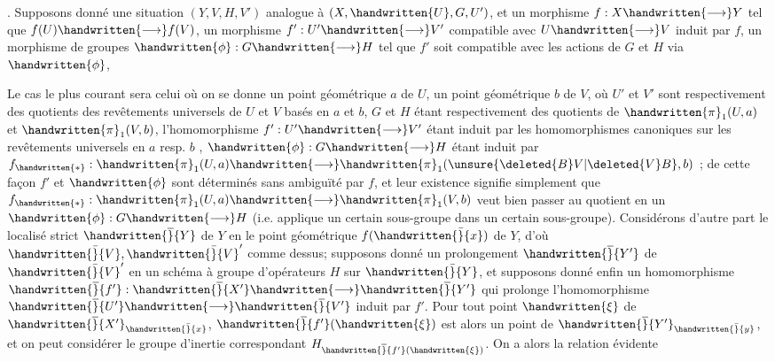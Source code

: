 
. Supposons donné une situation $(Y,V,H,V')$ analogue à $(X,\handwritten{U},G,U')$, et un morphisme $f:X\handwritten{\longrightarrow}Y$ tel que $f(U)\handwritten{\longrightarrow}f(V)$, un morphisme $f':U'\handwritten{\longrightarrow}V'$ compatible avec $U\handwritten{\longrightarrow}V$ induit par $f$, un morphisme de groupes $\handwritten{\phi}:G\handwritten{\longrightarrow}H$ tel que  $f'$ soit compatible avec les actions de $G$ et $H$ via $\handwritten{\phi}$, 

Le cas le plus courant sera celui où on se donne un point géométrique $a$ de $U$,  un point géométrique $b$  de $V$, où $U'$ et $V'$ sont respectivement des quotients des revêtements universels de $U$ et $V$ basés en $a$ et $b$, $G$ et $H$ étant respectivement des quotients de $\handwritten{\pi}_{1}(U,a)$ et $\handwritten{\pi}_{1}(V,b)$, l'homomorphisme $f':U'\handwritten{\longrightarrow}V'$ étant induit par les homomorphismes canoniques sur les revêtements universels en $a$ resp. $b$  ,  $\handwritten{\phi}:G\handwritten{\longrightarrow}H$ étant induit par $f_{\handwritten{*}}:\handwritten{\pi}_{1}(U,a)\handwritten{\longrightarrow}\handwritten{\pi}_{1}(\unsure{\deleted{B}V|\deleted{V}B},b)$ ; de cette façon $f'$ et $\handwritten{\phi}$ sont déterminés sans ambiguïté par $f$, et leur existence signifie simplement que $f_{\handwritten{*}}:\handwritten{\pi}_{1}(U,a)\handwritten{\longrightarrow}\handwritten{\pi}_{1}(V,b)$ veut bien passer au quotient en un $\handwritten{\phi}:G\handwritten{\longrightarrow}H$ (i.e. applique un certain sous-groupe dans un certain sous-groupe). Considérons d'autre part le localisé strict $\handwritten{\overline}{Y}$ de $Y$ en le point géométrique $f(\handwritten{\bar}{x})$ de $Y$, d'où  $\handwritten{\bar}{V},\handwritten{\bar}{V}'$ comme dessus; supposons donné un prolongement $\handwritten{\overline}{Y'}$ de $\handwritten{\bar}{V}'$ en un schéma à groupe d'opérateurs $H$ sur $\handwritten{\bar}{Y}$, et supposons donné enfin un homomorphisme $\handwritten{\overline}{f'}:\handwritten{\overline}{X'}\handwritten{\longrightarrow}\handwritten{\overline}{Y'}$ qui prolonge l'homomorphisme  $\handwritten{\overline}{U'}\handwritten{\longrightarrow}\handwritten{\overline}{V'}$ induit par $f'$. Pour tout point $\handwritten{\xi}$ de $\handwritten{\overline}{X'}_{\handwritten{\bar}{x}}$, $\handwritten{\overline}{f'}(\handwritten{\xi})$ est alors un point de $\handwritten{\overline}{Y'}_{\handwritten{\bar}{y}}$, et on peut considérer le groupe d'inertie correspondant $H_{\handwritten{\overline}{f'}(\handwritten{\xi})}$. On a alors la relation évidente
